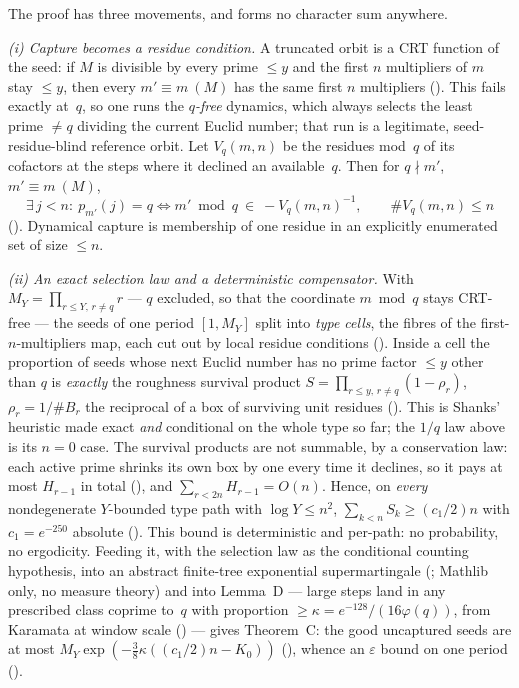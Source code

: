 \documentclass[10pt,a4paper]{article}
\begin{document}
The proof has three movements, and forms no character sum anywhere.

\emph{(i) Capture becomes a residue condition.}  A truncated orbit is a CRT
function of the seed: if $M$ is divisible by every prime $\le y$ and the
first $n$ multipliers of $m$ stay $\le y$, then every $m'\equiv m\ (M)$ has
the same first $n$ multipliers
().  This
fails exactly at~$q$, so one runs the \emph{$q$-free} dynamics, which always
selects the least prime $\ne q$ dividing the current Euclid number; that run
is a legitimate, seed-residue-blind reference orbit.  Let $V_q(m,n)$ be the
residues mod~$q$ of its cofactors at the steps where it declined an
available~$q$.  Then for $q\nmid m'$, $m'\equiv m\ (M)$,
\[
  \exists\,j<n:\ p_{m'}(j)=q
  \iff
  m'\bmod q\ \in\ -V_q(m,n)^{-1},
  \qquad \#V_q(m,n)\le n
\]
().
Dynamical capture is membership of one residue in an explicitly enumerated
set of size $\le n$.

\emph{(ii) An exact selection law and a deterministic compensator.}  With
$M_Y=\prod_{r\le Y,\,r\ne q}r$ --- $q$ excluded, so that the coordinate
$m\bmod q$ stays CRT-free --- the seeds of one period $[1,M_Y]$ split into
\emph{type cells}, the fibres of the first-$n$-multipliers map, each cut out
by local residue conditions
().  Inside a
cell the proportion of seeds whose next Euclid number has no prime factor
$\le y$ other than $q$ is \emph{exactly} the roughness survival product
$S=\prod_{r\le y,\,r\ne q}(1-\rho_r)$, $\rho_r=1/\#B_r$ the reciprocal of a
box of surviving unit residues
().  This is Shanks'
heuristic made exact \emph{and} conditional on the whole type so far; the
$1/q$ law above is its $n=0$ case.  The survival products are not summable,
by a conservation law: each active prime shrinks its own box by one every
time it declines, so it pays at most $H_{r-1}$ in total
(), and
$\sum_{r<2n}H_{r-1}=O(n)$.  Hence, on \emph{every} nondegenerate $Y$-bounded
type path with $\log Y\le n^2$,
$\sum_{k<n}S_k\ge (c_1/2)n$ with $c_1=e^{-250}$ absolute
().  This
bound is deterministic and per-path: no probability, no ergodicity.  Feeding
it, with the selection law as the conditional counting hypothesis, into an
abstract finite-tree exponential supermartingale
(; Mathlib
only, no measure theory) and into Lemma~D --- large steps land in any
prescribed class coprime to~$q$ with proportion $\ge\kappa=e^{-128}/(16\varphi(q))$,
from Karamata at window scale
() --- gives Theorem~C: the
good uncaptured seeds are at most $M_Y\exp(-\tfrac38\kappa((c_1/2)n-K_0))$
(), whence an $\varepsilon$
bound on one period
().
\end{document}
